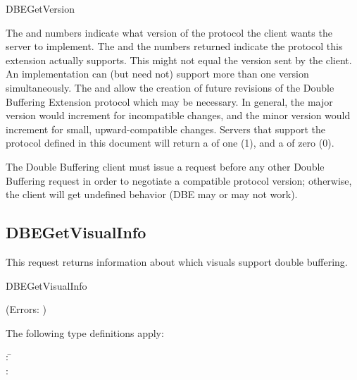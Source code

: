\begin{arequest}{DBEGetVersion}
\areply
{}
\end{arequest}

The  and 
numbers indicate what version of the protocol the client wants the
server to implement.  The  and the
 numbers returned indicate the protocol
this extension actually supports.  This might not equal the version
sent by the client.  An implementation can (but need not) support more
than one version simultaneously.  The 
and  allow the creation of future
revisions of the Double Buffering Extension protocol which may be
necessary.  In general, the major version would increment for
incompatible changes, and the minor version would increment for small,
upward-compatible changes.  Servers that support the protocol defined
in this document will return a  of one
(1), and a  of zero (0).

The Double Buffering client must issue a 
request before any other Double Buffering request in order to
negotiate a compatible protocol version; otherwise, the client will get
undefined behavior (DBE may or may not work).

\subsection{DBEGetVisualInfo}

This request returns information about which visuals support double
buffering.

\begin{arequest}{DBEGetVisualInfo}
\areply
{}
\end{arequest}

(Errors: )

The following type definitions apply:

\begin{tabbing}
: \= \\
: \> [ \= \typename{VISUALID} \argname{visual};\\
			\>\> \typename{CARD8} \argname{depth};\\
			\>\> \typename{CARD8} \argname{perflevel} ]\\
\end{tabbing}

